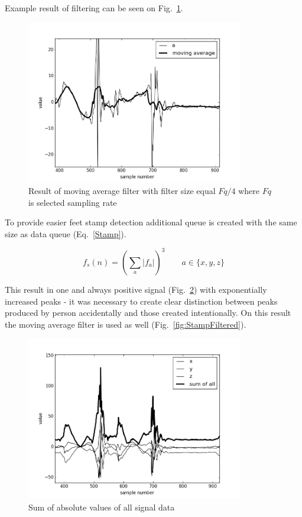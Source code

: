 \documentclass[conference]{IEEEtran}
\begin{document}
Example result of filtering can be seen on Fig.~\ref{fig:MovinAverageExample}.

\begin{figure}[!h]
    \centering
    \includegraphics[width=9.5cm]{Images/MovinAverageExample.png}
    \caption{Result of moving average filter with filter size equal $Fq/4$ where $Fq$ is selected sampling rate}
    \label{fig:MovinAverageExample}
\end{figure}

To provide easier feet stamp detection additional queue is created with the same size as data queue (Eq.~\ref{Stamp}).

\begin{equation}
    f_s(n) = \left(\sum\limits_{a} |f_a|\right)^3 \qquad a\in \{x, y, z\}
    \label{Stamp}
\end{equation}

This result in one and always positive signal (Fig.~\ref{fig:Stamp}) with exponentially increased peaks - it was necessary to create clear distinction between peaks produced by person accidentally and those created intentionally.
On this result the moving average filter is used as well (Fig.~\ref{fig:StampFiltered}).

\begin{figure}[!h]
    \centering
    \includegraphics[width=9.5cm]{Images/Stamp.png}
    \caption{Sum of absolute values of all signal data}
    \label{fig:Stamp}
\end{figure}
\end{document}
